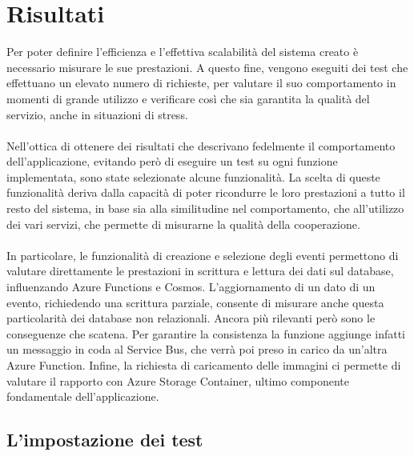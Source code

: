 \chapter{Risultati}
Per poter definire l'efficienza e l'effettiva scalabilità del sistema creato 
è necessario misurare le sue prestazioni. 
A questo fine, vengono eseguiti dei test che effettuano un elevato numero di richieste,
per valutare il suo comportamento in momenti di grande utilizzo e
verificare così che sia garantita la qualità del servizio, anche in situazioni di stress.\\
\\
Nell'ottica di ottenere dei risultati che descrivano fedelmente 
il comportamento dell'applicazione, 
evitando però di eseguire un test su ogni funzione implementata,
sono state selezionate alcune funzionalità.
La scelta di queste funzionalità deriva dalla capacità 
di poter ricondurre le loro prestazioni a tutto il resto del sistema,
in base sia alla similitudine nel comportamento,
che all'utilizzo dei vari servizi, che permette di misurarne la qualità della cooperazione.\\
\\
In particolare, le funzionalità di creazione e selezione degli eventi permettono 
di valutare direttamente le prestazioni in scrittura e lettura dei dati sul database, 
influenzando Azure Functions e Cosmos.
L'aggiornamento di un dato di un evento,
richiedendo una scrittura parziale, 
consente di misurare anche questa particolarità dei database non relazionali.
Ancora più rilevanti però sono le conseguenze che scatena.
Per garantire la consistenza la funzione aggiunge infatti un messaggio in coda al Service Bus,
che verrà poi preso in carico da un'altra Azure Function.
Infine, la richiesta di caricamento delle immagini ci permette 
di valutare il rapporto con Azure Storage Container, 
ultimo componente fondamentale dell'applicazione.
\clearpage
\section{L'impostazione dei test}

